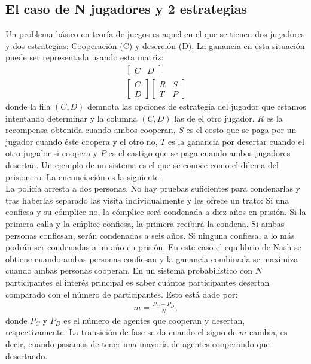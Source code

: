 \documentclass[letterpaper,12pt,oneside]{book}
\begin{document}
\subsection{El caso de N jugadores y 2 estrategias}
Un problema b\'asico en teor\'ia de juegos es aquel en el que se tienen dos jugadores y dos estrategias: Cooperaci\'on (C) y deserci\'on (D). La ganancia en esta situaci\'on puede ser representada usando esta matriz:
%
\begin{eqnarray}
\begin{bmatrix}
  C & D
\end{bmatrix} \\ \nonumber
\begin{bmatrix}
  C\\
  D
\end{bmatrix}\nonumber
\begin{bmatrix}
  R & S\\
  T & P
\end{bmatrix}\label{matrizNash}
\end{eqnarray}
%
donde la fila $(C,D)$ demnota las opciones de estrategia del jugador que estamos intentando determinar y la columna $(C, D)$ las de el otro jugador. $R$ es la recompensa obtenida cuando ambos cooperan, $S$ es el costo que se paga por un jugador cuando \'este coopera y el otro no, $T$ es la ganancia por desertar cuando el otro jugador si coopera y $P$ es el castigo que se paga cuando ambos jugadores desertan.
Un ejemplo de un sistema es el que se conoce como el dilema del prisionero. La encunciación es la siguiente: \\
La polic\'ia arresta a dos personas. No hay pruebas suficientes para condenarlas y tras haberlas separado las visita individualmente y les ofrece un trato: Si una confiesa y su c\'omplice no, la c\'omplice será condenada a diez a\~nos en prisi\'on. Si la primera calla y la c\'mplice confiesa, la primera recibir\'a la condena. Si ambas personas confiesan, ser\'an condenadas a seis años. Si ninguna confiesa, a lo m\'as podr\'an ser condenadas a un año en prisi\'on.
En este caso el equilibrio de Nash se obtiene cuando ambas personas confiesan y la ganancia combinada se maximiza cuando ambas personas cooperan.
En un sistema probabil\'istico con $N$ participantes el inter\'es principal es saber cu\'antos participantes desertan comparado con el n\'umero de participantes. Esto est\'a dado por: 
%
\begin{eqnarray}
m=\frac{P_C - P_D}{N}, \label{mJuegos}
\end{eqnarray}
%
donde $P_C$ y $P_D$ es el n\'umero de agentes que cooperan y desertan, respectivamente. La transici\'on de fase se da cuando el signo de $m$ cambia, es decir, cuando pasamos de tener una mayoría de agentes cooperando que desertando. 
\end{document}
